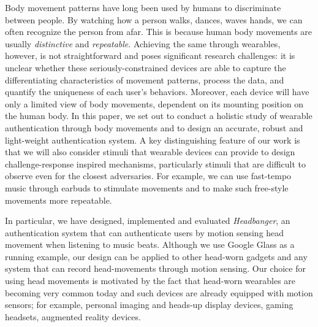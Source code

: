 \vspace{1mm} Body movement
patterns have long been used by humans to discriminate between people. By
watching how a person walks, dances, waves hands, we can often recognize
the person from afar. This is because human body movements are usually
\emph{distinctive} and \emph{repeatable}. Achieving the same through
wearables, however, is not straightforward and poses significant research
challenges: it is unclear whether these seriously-constrained devices are able
to capture the differentiating characteristics of movement patterns, process the data, and quantify the
uniqueness of each user's behaviors. Moreover, each device will have only a
limited view of body movements, dependent on its mounting position on the
human body. In this paper, we set out to conduct a holistic study of wearable
authentication through body movements and to design an accurate, robust and
light-weight authentication system. A key distinguishing feature of our work
is that we will also consider stimuli that wearable devices can provide to
design challenge-response inspired mechanisms, particularly stimuli that are
difficult to observe even for the closest adversaries. For example, we can use
fast-tempo music through earbuds to stimulate movements and to make such
free-style movements more repeatable.

In particular, we have designed, implemented and evaluated {\em Headbanger},
an authentication system that can authenticate users by motion sensing head movement when listening to music beats. Although we
use Google Glass as a running example, our design can
be applied to other head-worn gadgets and any system that can record
head-movements through motion sensing. Our choice for using head movements is
motivated by the fact that head-worn wearables are becoming very common today
and such devices are already equipped with motion sensors; for example,
personal imaging and heads-up display devices, gaming headsets, augmented reality devices.



